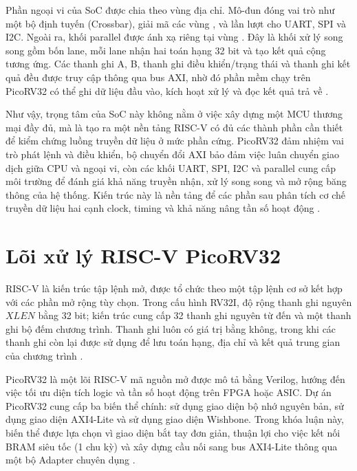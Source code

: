 Phần ngoại vi của SoC được chia theo vùng địa chỉ. Mô-đun  đóng vai trò như một bộ định tuyến (Crossbar), giải mã các vùng ,  và  lần lượt cho UART, SPI và I2C. Ngoài ra, khối parallel được ánh xạ riêng tại vùng . Đây là khối xử lý song song gồm bốn lane, mỗi lane nhận hai toán hạng 32 bit và tạo kết quả cộng tương ứng. Các thanh ghi A, B, thanh ghi điều khiển/trạng thái và thanh ghi kết quả đều được truy cập thông qua bus AXI, nhờ đó phần mềm chạy trên PicoRV32 có thể ghi dữ liệu đầu vào, kích hoạt xử lý và đọc kết quả trả về \cite{amd_axi4lite_hls,picorv32_repo}.

Như vậy, trọng tâm của SoC này không nằm ở việc xây dựng một MCU thương mại đầy đủ, mà là tạo ra một nền tảng RISC-V có đủ các thành phần cần thiết để kiểm chứng luồng truyền dữ liệu ở mức phần cứng. PicoRV32 đảm nhiệm vai trò phát lệnh và điều khiển, bộ chuyển đổi AXI bảo đảm việc luân chuyển giao dịch giữa CPU và ngoại vi, còn các khối UART, SPI, I2C và parallel cung cấp môi trường để đánh giá khả năng truyền nhận, xử lý song song và mở rộng băng thông của hệ thống. Kiến trúc này là nền tảng để các phần sau phân tích cơ chế truyền dữ liệu hai cạnh clock, timing và khả năng nâng tần số hoạt động \cite{picorv32_repo,riscv_unprivileged}.

\section{Lõi xử lý RISC-V PicoRV32}

RISC-V là kiến trúc tập lệnh mở, được tổ chức theo một tập lệnh cơ sở kết hợp với
các phần mở rộng tùy chọn. Trong cấu hình RV32I, độ rộng thanh ghi nguyên
$XLEN$ bằng 32 bit; kiến trúc cung cấp 32 thanh ghi nguyên từ  đến
 và một thanh ghi bộ đếm chương trình. Thanh ghi  luôn có
giá trị bằng không, trong khi các thanh ghi còn lại được sử dụng để lưu toán
hạng, địa chỉ và kết quả trung gian của chương trình \cite{riscv_unprivileged}.

PicoRV32 là một lõi RISC-V mã nguồn mở được mô tả bằng Verilog, hướng đến việc
tối ưu diện tích logic và tần số hoạt động trên FPGA hoặc ASIC. Dự án PicoRV32
cung cấp ba biến thể chính:  sử dụng giao diện bộ nhớ nguyên bản,
 sử dụng giao diện AXI4-Lite và  sử dụng
giao diện Wishbone. Trong khóa luận này, biến thể  được lựa chọn
vì giao diện bắt tay đơn giản, thuận lợi cho việc kết nối BRAM siêu tốc (1 chu kỳ) và xây dựng cầu
nối sang bus AXI4-Lite thông qua một bộ Adapter chuyên dụng \cite{picorv32_repo}.

